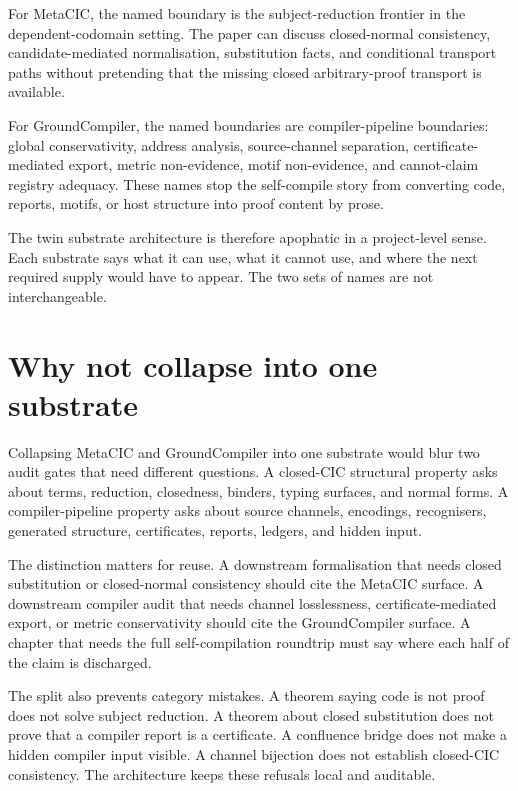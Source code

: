 For MetaCIC, the named boundary is the subject-reduction frontier in the
dependent-codomain setting. The paper can discuss closed-normal consistency,
candidate-mediated normalisation, substitution facts, and conditional
transport paths without pretending that the missing closed arbitrary-proof
transport is available.

For GroundCompiler, the named boundaries are compiler-pipeline boundaries:
global conservativity, address analysis, source-channel separation,
certificate-mediated export, metric non-evidence, motif non-evidence, and
cannot-claim registry adequacy. These names stop the self-compile story from
converting code, reports, motifs, or host structure into proof content by
prose.

The twin substrate architecture is therefore apophatic in a project-level
sense. Each substrate says what it can use, what it cannot use, and where the
next required supply would have to appear. The two sets of names are not
interchangeable.

\section{Why not collapse into one substrate}
\label{sec:twin-substrate-synthesis-no-collapse}

Collapsing MetaCIC and GroundCompiler into one substrate would blur two audit
gates that need different questions. A closed-CIC structural property asks
about terms, reduction, closedness, binders, typing surfaces, and normal
forms. A compiler-pipeline property asks about source channels, encodings,
recognisers, generated structure, certificates, reports, ledgers, and hidden
input.

The distinction matters for reuse. A downstream formalisation that needs
closed substitution or closed-normal consistency should cite the MetaCIC
surface. A downstream compiler audit that needs channel losslessness,
certificate-mediated export, or metric conservativity should cite the
GroundCompiler surface. A chapter that needs the full self-compilation
roundtrip must say where each half of the claim is discharged.

The split also prevents category mistakes. A theorem saying code is not proof
does not solve subject reduction. A theorem about closed substitution does not
prove that a compiler report is a certificate. A confluence bridge does not
make a hidden compiler input visible. A channel bijection does not establish
closed-CIC consistency. The architecture keeps these refusals local and
auditable.


